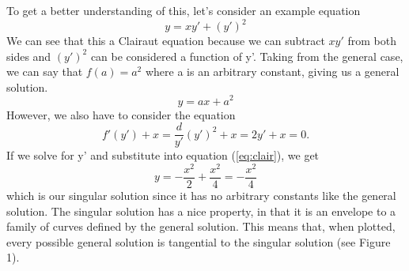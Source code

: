 \documentclass{article}
\newcommand{\be}{\begin{equation}}
\newcommand{\ee}{\end{equation}}
\begin{document}
To get a better understanding of this, let's consider an example equation
\be
y = x y' + (y')^2
\ee
We can see that this a Clairaut equation because we can subtract $xy'$ from both sides and $(y')^2$ can be considered a function of y'.
Taking from the general case, we can say that $f(a) = a^2$ where a is an arbitrary constant, giving us a general solution.
\be
y = ax + a^2
\ee
However, we also have to consider the equation
\be
f'(y') + x = \frac{d}{y'} (y')^2 + x = 2y' + x = 0.
\ee
If we solve for y' and substitute into equation (\ref{eq:clair}), we get
\be
y = -\frac{x^2}{2} + \frac{x^2}{4} = -\frac{x^2}{4}
\ee
which is our singular solution since it has no arbitrary constants like the general solution.
The singular solution has a nice property, in that it is an envelope to a family of curves defined by the general solution.
This means that, when plotted, every possible general solution is tangential to the singular solution (see Figure 1). %
\end{document}
